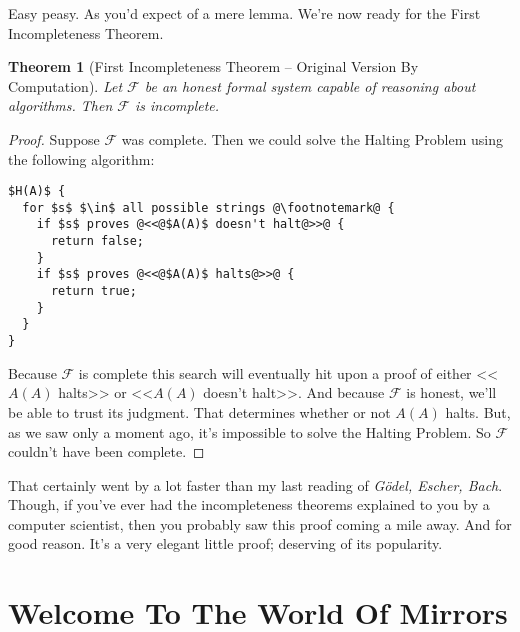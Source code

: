\documentclass{article}
\theoremstyle{theorem}
\newtheorem{theorem}{Theorem}
\begin{document}
Easy peasy. As you'd expect of a mere lemma. We're now ready for the First Incompleteness Theorem.

\begin{theorem}[First Incompleteness Theorem -- Original Version By Computation]
Let $\mathcal{F}$ be an honest formal system capable of reasoning about algorithms. Then $\mathcal{F}$ is incomplete.
\end{theorem}

\begin{proof}
Suppose $\mathcal{F}$ was complete. Then we could solve the Halting Problem using the following algorithm:\\[0.5em]
\begin{minipage}{\linewidth}
\begin{lstlisting}
$H(A)$ {
  for $s$ $\in$ all possible strings @\footnotemark@ {
    if $s$ proves @<<@$A(A)$ doesn't halt@>>@ {
      return false;
    }
    if $s$ proves @<<@$A(A)$ halts@>>@ {
      return true;
    }
  }
}
\end{lstlisting}
\end{minipage}
Because $\mathcal{F}$ is complete this search will eventually hit upon a proof of  either <<$A(A)$ halts>> or <<$A(A)$ doesn't halt>>. And because $\mathcal{F}$ is honest, we'll be able to trust its judgment. That determines whether or not $A(A)$ halts. But, as we saw only a moment ago, it's impossible to solve the Halting Problem. So $\mathcal{F}$ couldn't have been complete.
\end{proof}

That certainly went by a lot faster than my last reading of \textit{Gödel, Escher, Bach}. Though, if you've ever had the incompleteness theorems explained to you by a computer scientist, then you probably saw this proof coming a mile away. And for good reason. It's a very elegant little proof; deserving of its popularity.

\section{Welcome To The World Of Mirrors}
\end{document}
